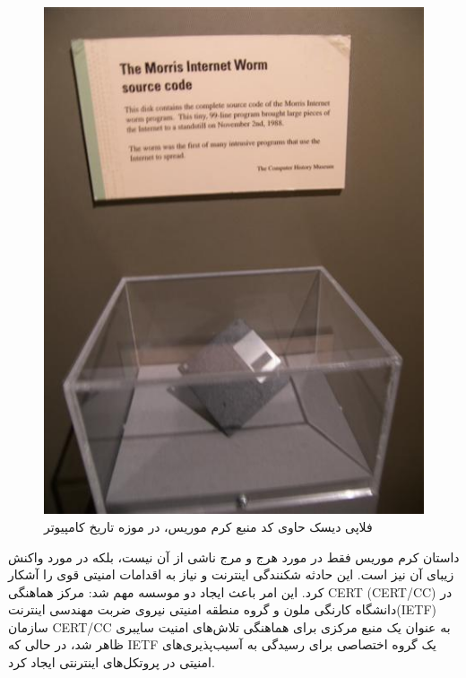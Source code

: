 \documentclass{ISCISC2020}
\begin{document}
\begin{figure}[h]
	\includegraphics[width=\linewidth]{Images/Morris_Worm.jpg}
 	\caption{فلاپی دیسک حاوی کد منبع کرم موریس، در موزه تاریخ کامپیوتر\lr{[1]}}

\end{figure}

داستان کرم موریس فقط در مورد هرج و مرج ناشی از آن نیست، بلکه در مورد واکنش زیبای آن نیز است. این حادثه شکنندگی اینترنت و نیاز به اقدامات امنیتی قوی را آشکار کرد. این امر باعث ایجاد دو موسسه مهم شد: مرکز هماهنگی CERT (CERT/CC) در دانشگاه کارنگی ملون و گروه منطقه امنیتی نیروی ضربت مهندسی اینترنت(IETF) سازمان CERT/CC به عنوان یک منبع مرکزی برای هماهنگی تلاش‌های امنیت سایبری ظاهر شد، در حالی که IETF یک گروه اختصاصی برای رسیدگی به آسیب‌پذیری‌های امنیتی در پروتکل‌های اینترنتی ایجاد کرد.
\end{document}
